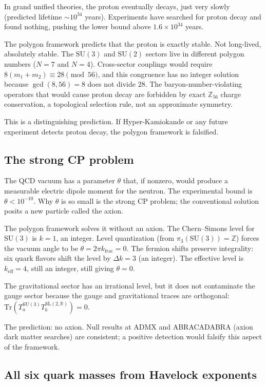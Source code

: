 In grand unified theories, the proton eventually decays, just very
slowly (predicted lifetime $\sim 10^{34}$ years). Experiments have
searched for proton decay and found nothing, pushing the lower bound
above $1.6 \times 10^{34}$ years.

The polygon framework predicts that the proton is exactly stable.
Not long-lived, absolutely stable. The $\mathrm{SU}(3)$ and
$\mathrm{SU}(2)$ sectors live in different polygon numbers ($N = 7$
and $N = 4$). Cross-sector couplings would require
$8(m_1 + m_2) \equiv 28 \pmod{56}$, and this congruence has no
integer solution because $\gcd(8, 56) = 8$ does not divide $28$.
The baryon-number-violating operators that would cause proton decay
are forbidden by exact $\mathbb{Z}_{56}$ charge conservation, a
topological selection rule, not an approximate symmetry.

This is a distinguishing prediction. If Hyper-Kamiokande or any future
experiment detects proton decay, the polygon framework is falsified.

\subsection*{The strong CP problem}

The QCD vacuum has a parameter $\theta$ that, if nonzero, would
produce a measurable electric dipole moment for the neutron. The
experimental bound is $\theta < 10^{-10}$. Why $\theta$ is so small
is the strong CP problem; the conventional solution posits a new
particle called the axion.

The polygon framework solves it without an axion. The Chern--Simons
level for $\mathrm{SU}(3)$ is $k = 1$, an integer. Level
quantization (from $\pi_3(\mathrm{SU}(3)) = \mathbb{Z}$) forces the
vacuum angle to be $\theta = 2\pi k_{\text{frac}} = 0$. The fermion
shifts preserve integrality: six quark flavors shift the level by
$\Delta k = 3$ (an integer). The effective level is $k_{\text{eff}} =
4$, still an integer, still giving $\theta = 0$.

The gravitational sector has an irrational level, but it does not
contaminate the gauge sector because the gauge and gravitational traces
are orthogonal:
$\text{Tr}(T^{\mathrm{SU}(3)}_a T^{\mathrm{SL}(2,\mathbb{R})}_b) = 0$.

The prediction: no axion. Null results at ADMX and ABRACADABRA
(axion dark matter searches) are consistent; a positive detection
would falsify this aspect of the framework.

\subsection*{All six quark masses from Havelock exponents}

